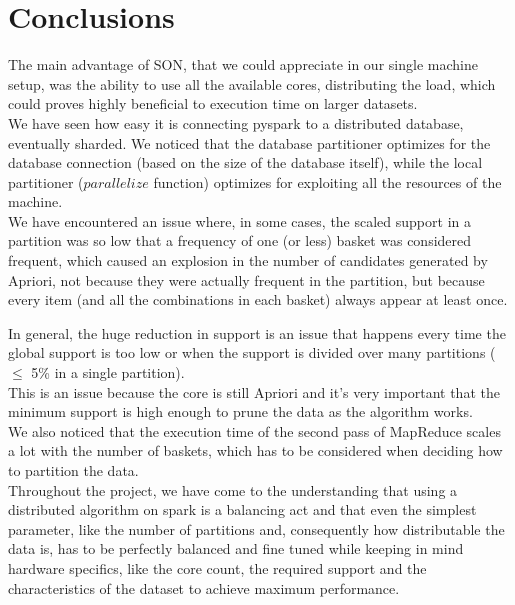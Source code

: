 \documentclass[a4paper]{article}
\begin{document}
	\section{Conclusions}
	The main advantage of SON, that we could appreciate in our single machine setup, was the ability to use all the available cores, distributing the load, which could proves highly beneficial to execution time on larger datasets.\\

	We have seen how easy it is connecting pyspark to a distributed database, eventually sharded.	
	We noticed that the database partitioner optimizes for the database connection (based on the size of the database itself), 
	while the local partitioner ($parallelize$ function) optimizes for exploiting all the resources of the machine.\\
	
	We have encountered an issue where, in some cases, the scaled support in a partition was so low that a frequency of one (or less) basket was considered frequent, 
	which caused an explosion in the number of candidates generated by Apriori, not because they were actually frequent in the partition, but 
	because every item (and all the combinations in each basket) always appear at least once. 

	In general, the huge reduction in support is an issue that happens every time the global support is too low or when the support is divided over many partitions ($\leq$ 5\% in a single partition).\\
	This is an issue because the core is still Apriori and it's very important that the minimum support is high enough to prune the data as the algorithm works.\\

	We also noticed that the execution time of the second pass of MapReduce scales a lot with the number of baskets, which has to be considered when deciding how to partition the data.\\

	Throughout the project, we have come to the understanding that using a distributed algorithm on spark is a balancing act and that even the simplest parameter, like the number of partitions and, consequently how distributable 
	the data is, has to be perfectly balanced and fine tuned while keeping in mind hardware specifics, like the core count, the required support and the characteristics of the dataset to achieve 
	maximum performance.\\
\end{document}
